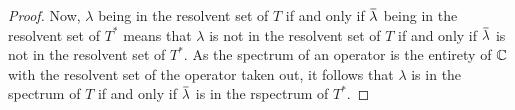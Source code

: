 \begin{proof}
  \medskip

  Now, $\lambda$ being in the resolvent set of $T$ if and only if $\conjugate{\lambda}$ being in the resolvent set of $T^*$ means that $\lambda$ is not in the resolvent set of $T$ if and only if $\conjugate{\lambda}$ is not in the resolvent set of $T^*$. As the spectrum of an operator is the entirety of $\mathbb{C}$ with the resolvent set of the operator taken out, it follows that $\lambda$ is in the spectrum of $T$ if and only if $\conjugate{\lambda}$ is in the rspectrum of $T^*$.
\end{proof}
